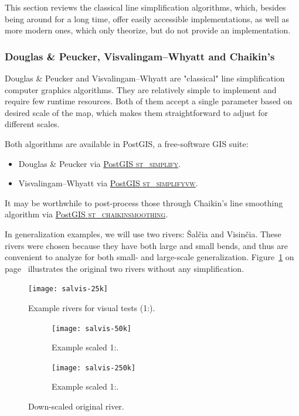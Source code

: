 \documentclass[a4paper]{article}
\newcommand{\onpage}[1]{\ref{#1} on page~\pageref{#1}}
\newcommand{\DP}{Douglas \& Peucker}
\newcommand{\VW}{Visvalingam--Whyatt}
\begin{document}
This section reviews the classical line simplification algorithms, which,
besides being around for a long time, offer easily accessible implementations,
as well as more modern ones, which only theorize, but do not provide an
implementation.

\subsubsection{{\DP}, {\VW} and Chaikin's}
\label{sec:dp-vw-chaikin}

{\DP}\cite{douglas1973algorithms} and {\VW}\cite{visvalingam1993line} are
"classical" line simplification computer graphics algorithms. They are
relatively simple to implement and require few runtime resources. Both of them
accept a single parameter based on desired scale of the map, which makes them
straightforward to adjust for different scales.

Both algorithms are available in PostGIS, a free-software GIS suite:
\begin{itemize}
    \item {\DP} via
        \href{https://postgis.net/docs/ST_Simplify.html}{PostGIS \textsc{st\_simplify}}.

    \item {\VW} via
        \href{https://postgis.net/docs/ST_SimplifyVW.html}{PostGIS
        \textsc{st\_simplifyvw}}.
\end{itemize}

It may be worthwhile to post-process those through Chaikin's line smoothing
algorithm\cite{chaikin1974algorithm} via
\href{https://postgis.net/docs/ST_ChaikinSmoothing.html}{PostGIS
\textsc{st\_chaikinsmoothing}}.

In generalization examples, we will use two rivers: Šalčia and Visinčia.
These rivers were chosen because they have both large and small bends, and
thus are convenient to analyze for both small- and large-scale generalization.
Figure~\onpage{fig:salvis-25} illustrates the original two rivers without any
simplification.

\begin{figure}[ht]
    \centering
    \texttt{[image: salvis-25k]}
    \caption{Example rivers for visual tests (1:{}).}
    \label{fig:salvis-25}
\end{figure}

\begin{figure}[ht]
    \centering
    \begin{subfigure}[b]{.49\textwidth}
        \texttt{[image: salvis-50k]}
        \caption{Example scaled 1:.}
        \label{fig:salvis-50k}
    \end{subfigure}
    \hfill
    \begin{subfigure}[b]{.49\textwidth}
        \centering
        \texttt{[image: salvis-250k]}
        \caption{Example scaled 1:.}
    \end{subfigure}
    \caption{Down-scaled original river.}
    \label{fig:salvis-50-250}
\end{figure}
\end{document}
